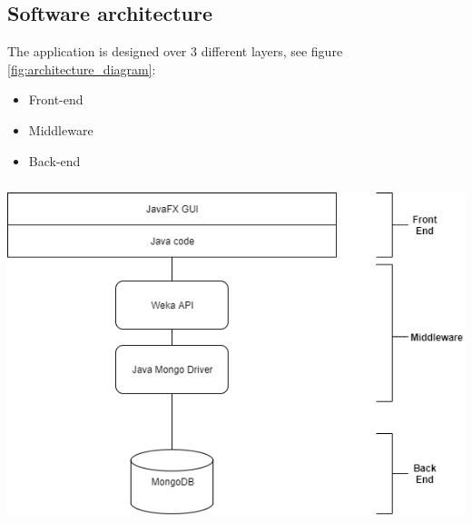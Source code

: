 \documentclass[a4paper, oneside]{article}
\begin{document}
\subsection{Software architecture}
The application is designed over 3 different layers, see figure \ref{fig:architecture_diagram}:
\begin{itemize}
\item Front-end
\item Middleware
\item Back-end
\end{itemize}
\vspace{5mm}
\begin{minipage}{\linewidth}
\begin{center}
\vspace{1mm}
\includegraphics[height = 100mm]{./images/diagrams/architecture} 
\vspace{6mm}
\label{fig:architecture_diagram}
\end{center}
\end{minipage}
\vspace{7mm}
\clearpage

\iffalse
\end{document}
